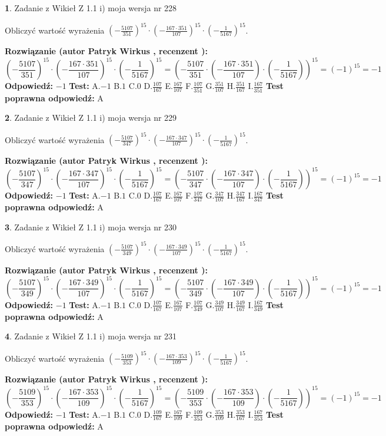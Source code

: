 \documentclass[12pt, a4paper]{article}
\theoremstyle{definition} %
\newtheorem{zad}{}
\newcommand{\zadStart}[1]{\begin{zad}#1\newline}
\newcommand{\zadStop}{\end{zad}}
\newcommand{\rozwStart}[2]{\noindent \textbf{Rozwiązanie (autor #1 , recenzent #2): }\newline}
\newcommand{\rozwStop}{\newline}
\newcommand{\odpStart}{\noindent \textbf{Odpowiedź:}\newline}
\newcommand{\odpStop}{\newline}
\newcommand{\testStart}{\noindent \textbf{Test:}\newline}
\newcommand{\testStop}{\newline}
\newcommand{\kluczStart}{\noindent \textbf{Test poprawna odpowiedź:}\newline}
\newcommand{\kluczStop}{\newline}
\begin{document}
\zadStart{Zadanie z Wikieł Z 1.1 i) moja wersja nr 228}

Obliczyć wartość wyrażenia $(-\frac{5107}{351})^{15} \cdot (-\frac{167 \cdot 351}{107})^{15} \cdot (-\frac{1}{5167})^{15}$.
\zadStop
\rozwStart{Patryk Wirkus}{}
$$(-\frac{5107}{351})^{15} \cdot (-\frac{167 \cdot 351}{107})^{15} \cdot (-\frac{1}{5167})^{15} = (-\frac{5107}{351} \cdot (-\frac{167 \cdot 351}{107}) \cdot (-\frac{1}{5167}))^{15} = (-1)^{15} = -1$$
\rozwStop
\odpStart
$-1$
\odpStop
\testStart
A.$-1$ B.$1$ C.$0$ D.$\frac{107}{167}$ E.$\frac{167}{107}$
F.$\frac{107}{351}$ G.$\frac{351}{107}$
H.$\frac{351}{167}$
I.$\frac{167}{351}$
\testStop
\kluczStart
A
\kluczStop



\zadStart{Zadanie z Wikieł Z 1.1 i) moja wersja nr 229}

Obliczyć wartość wyrażenia $(-\frac{5107}{347})^{15} \cdot (-\frac{167 \cdot 347}{107})^{15} \cdot (-\frac{1}{5167})^{15}$.
\zadStop
\rozwStart{Patryk Wirkus}{}
$$(-\frac{5107}{347})^{15} \cdot (-\frac{167 \cdot 347}{107})^{15} \cdot (-\frac{1}{5167})^{15} = (-\frac{5107}{347} \cdot (-\frac{167 \cdot 347}{107}) \cdot (-\frac{1}{5167}))^{15} = (-1)^{15} = -1$$
\rozwStop
\odpStart
$-1$
\odpStop
\testStart
A.$-1$ B.$1$ C.$0$ D.$\frac{107}{167}$ E.$\frac{167}{107}$
F.$\frac{107}{347}$ G.$\frac{347}{107}$
H.$\frac{347}{167}$
I.$\frac{167}{347}$
\testStop
\kluczStart
A
\kluczStop



\zadStart{Zadanie z Wikieł Z 1.1 i) moja wersja nr 230}

Obliczyć wartość wyrażenia $(-\frac{5107}{349})^{15} \cdot (-\frac{167 \cdot 349}{107})^{15} \cdot (-\frac{1}{5167})^{15}$.
\zadStop
\rozwStart{Patryk Wirkus}{}
$$(-\frac{5107}{349})^{15} \cdot (-\frac{167 \cdot 349}{107})^{15} \cdot (-\frac{1}{5167})^{15} = (-\frac{5107}{349} \cdot (-\frac{167 \cdot 349}{107}) \cdot (-\frac{1}{5167}))^{15} = (-1)^{15} = -1$$
\rozwStop
\odpStart
$-1$
\odpStop
\testStart
A.$-1$ B.$1$ C.$0$ D.$\frac{107}{167}$ E.$\frac{167}{107}$
F.$\frac{107}{349}$ G.$\frac{349}{107}$
H.$\frac{349}{167}$
I.$\frac{167}{349}$
\testStop
\kluczStart
A
\kluczStop



\zadStart{Zadanie z Wikieł Z 1.1 i) moja wersja nr 231}

Obliczyć wartość wyrażenia $(-\frac{5109}{353})^{15} \cdot (-\frac{167 \cdot 353}{109})^{15} \cdot (-\frac{1}{5167})^{15}$.
\zadStop
\rozwStart{Patryk Wirkus}{}
$$(-\frac{5109}{353})^{15} \cdot (-\frac{167 \cdot 353}{109})^{15} \cdot (-\frac{1}{5167})^{15} = (-\frac{5109}{353} \cdot (-\frac{167 \cdot 353}{109}) \cdot (-\frac{1}{5167}))^{15} = (-1)^{15} = -1$$
\rozwStop
\odpStart
$-1$
\odpStop
\testStart
A.$-1$ B.$1$ C.$0$ D.$\frac{109}{167}$ E.$\frac{167}{109}$
F.$\frac{109}{353}$ G.$\frac{353}{109}$
H.$\frac{353}{167}$
I.$\frac{167}{353}$
\testStop
\kluczStart
A
\kluczStop
\end{document}
